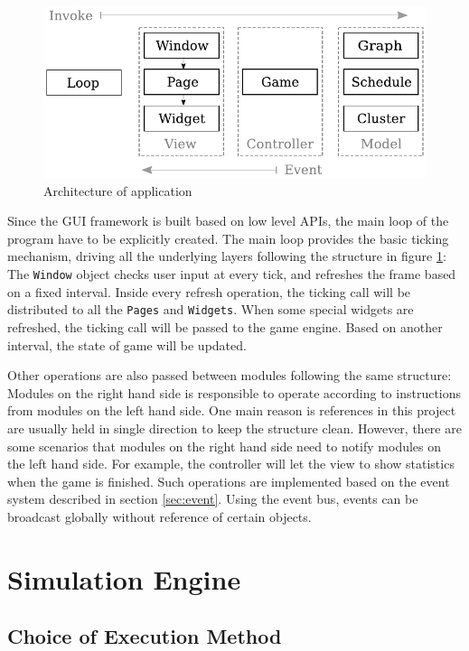 \documentclass[msc,deptreport, cs]{infthesis}
\begin{document}
\begin{figure}[!htb] 
  \centering
  \includegraphics[width=0.65\columnwidth]{architecture.pdf} \vspace{-0.3em}
  \caption{Architecture of application}
  \label{fig:architecture}
\end{figure} \vspace{-0.5em}

Since the GUI framework is built based on low level APIs, the main loop of the program have to be explicitly created. The main loop provides the basic ticking mechanism, driving all the underlying layers following the structure in figure \ref{fig:architecture}: The \verb+Window+ object checks user input at every tick, and refreshes the frame based on a fixed interval. Inside every refresh operation, the ticking call will be distributed to all the \verb+Pages+ and \verb+Widgets+. When some special widgets are refreshed, the ticking call will be passed to the game engine. Based on another interval, the state of game will be updated.

Other operations are also passed between modules following the same structure: Modules on the right hand side is responsible to operate according to instructions from modules on the left hand side. One main reason is references in this project are usually held in single direction to keep the structure clean. However, there are some scenarios that modules on the right hand side need to notify modules on the left hand side. For example, the controller will let the view to show statistics when the game is finished. Such operations are implemented based on the event system described in section \ref{sec:event}. Using the event bus, events can be broadcast globally without reference of certain objects.

\section{Simulation Engine}

\subsection{Choice of Execution Method}
\end{document}
